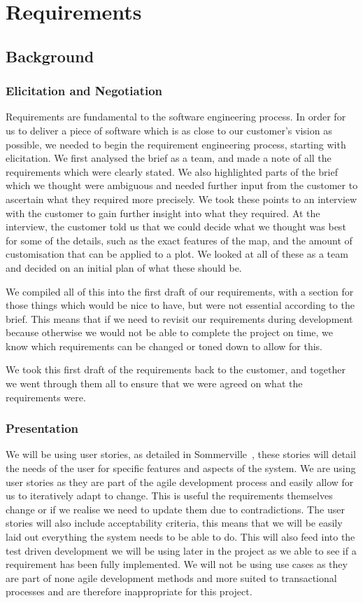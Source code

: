 \chapter{Requirements}
\section{Background}
\subsection{Elicitation and Negotiation}
Requirements are fundamental to the software engineering process.
In order for us to deliver a piece of software which is as close to our customer’s vision as possible, we needed to begin the requirement engineering process, starting with elicitation.
We first analysed the brief as a team, and made a note of all the requirements which were clearly stated.
We also highlighted parts of the brief which we thought were ambiguous and needed further input from the customer to ascertain what they required more precisely.
We took these points to an interview with the customer to gain further insight into what they required.
At the interview, the customer told us that we could decide what we thought was best for some of the details, such as the exact features of the map, and the amount of customisation that can be applied to a plot.
We looked at all of these as a team and decided on an initial plan of what these should be.

We compiled all of this into the first draft of our requirements, with a section for those things which would be nice to have, but were not essential according to the brief.
This means that if we need to revisit our requirements during development because otherwise we would not be able to complete the project on time, we know which requirements can be changed or toned down to allow for this.

We took this first draft of the requirements back to the customer, and together we went through them all to ensure that we were agreed on what the requirements were.


\subsection{Presentation}
We will be using user stories, as detailed in Sommerville~\cite{sommerville2016software}, these stories will detail the needs of the user for specific features and aspects of the system.
We are using user stories as they are part of the agile development process and easily allow for us to iteratively adapt to change.
This is useful the requirements themselves change or if we realise we need to update them due to contradictions.
The user stories will also include acceptability criteria, this means that we will be easily laid out everything the system needs to be able to do.
This will also feed into the test driven development we will be using later in the project as we able to see if a requirement has been fully implemented.
We will not be using use cases as they are part of none agile development methods and more suited to transactional processes and are therefore inappropriate for this project. 

